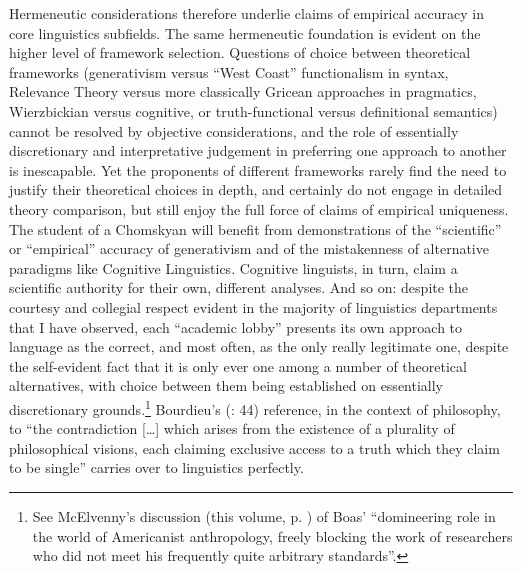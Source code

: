 \documentclass[output=paper]{langscibook}
\begin{document}
Hermeneutic considerations therefore underlie claims of empirical accuracy in core linguistics subfields. The same hermeneutic foundation is evident on the higher level of framework selection. Questions of choice between theoretical frameworks (generativism versus ``West Coast'' functionalism in syntax, Relevance Theory versus more classically Gricean approaches in pragmatics, Wierz\-bic\-kian versus cognitive, or truth-functional versus definitional semantics) cannot be resolved by objective considerations, and the role of essentially discretionary and interpretative judgement in preferring one approach to another is inescapable. Yet the proponents of different frameworks rarely find the need to justify their theoretical choices in depth, and certainly do not engage in detailed theory comparison, but still enjoy the full force of claims of empirical uniqueness. The student of a Chomskyan will benefit from demonstrations of the ``scientific'' or ``empirical'' accuracy of generativism and of the mistakenness of alternative paradigms like Cognitive Linguistics. Cognitive linguists, in turn, claim a scientific authority for their own, different analyses. And so on: despite the courtesy and collegial respect evident in the majority of linguistics departments that I have observed, each ``academic lobby'' \citep[155]{Rastier1993} presents its own approach to language as the correct, and most often, as the only really legitimate one, despite the self-evident fact that it is only ever one among a number of theoretical alternatives, with choice between them being established on essentially discretionary grounds.\footnote{See McElvenny's discussion (this volume, p. \pageref{q:mcelvenny:domineering}) of Boas' ``domineering role in the world of Americanist anthropology, freely blocking the work of researchers who did not meet his frequently quite arbitrary standards''.} Bourdieu's (\citeyear{Bourdieu20031997}: 44) reference, in the context of philosophy, to ``the contradiction […] which arises from the existence of a plurality of philosophical visions, each claiming exclusive access to a truth which they claim to be single'' carries over to linguistics perfectly.
\end{document}
